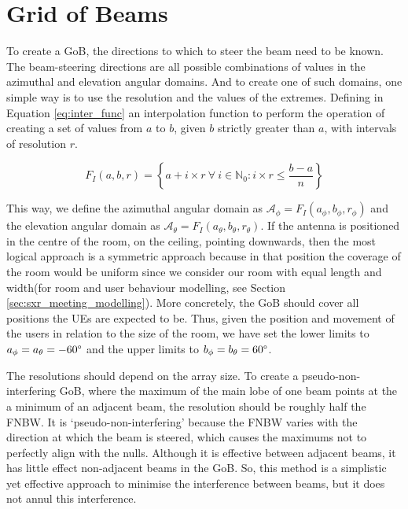 \section{Grid of Beams}
\label{sec:GoB}


To create a GoB, the directions to which to steer the beam need to be known. The beam-steering directions are all possible combinations of values in the azimuthal and elevation angular domains. And to create one of such domains, one simple way is to use the resolution and the values of the extremes. Defining in Equation \eqref{eq:inter_func} an interpolation function to perform the operation of creating a set of values from $a$ to $b$, given $b$ strictly greater than $a$, with intervals of resolution $r$.

\begin{equation} \label{eq:inter_func}
    F_I(a, b, r) = \left\{a + i \times r \  \forall \ i \in \mathbb{N}_0: i \times r \leq \frac{b-a}{n} \right\}
\end{equation}

This way, we define the azimuthal angular domain as $\mathcal{A}_\phi = F_I(a_\phi, b_\phi, r_\phi)$ and the elevation angular domain as $\mathcal{A}_\theta = F_I(a_\theta, b_\theta, r_\theta)$. If the antenna is positioned in the centre of the room, on the ceiling, pointing downwards, then the most logical approach is a symmetric approach because in that position the coverage of the room would be uniform since we consider our room with equal length and width(for room and user behaviour modelling, see Section \ref{sec:sxr_meeting_modelling}). More concretely, the GoB should cover all positions the UEs are expected to be. Thus, given the position and movement of the users in relation to the size of the room, we have set the lower limits to $a_\phi = a_\theta = -60\text{\textdegree}$ and the upper limits to $b_\phi = b_\theta = 60\text{\textdegree}$. 

The resolutions should depend on the array size. To create a pseudo-non-interfering GoB, where the maximum of the main lobe of one beam points at the a minimum of an adjacent beam, the resolution should be roughly half the \ac{FNBW}. It is `pseudo-non-interfering' because the \ac{FNBW} varies with the direction at which the beam is steered, which causes the maximums not to perfectly align with the nulls. Although it is effective between adjacent beams, it has little effect non-adjacent beams in the GoB. So, this method is a simplistic yet effective approach to minimise the interference between beams, but it does not annul this interference. 

